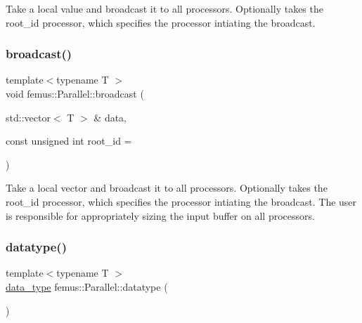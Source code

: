 Take a local value and broadcast it to all processors. Optionally takes the {\ttfamily root\+\_\+id} processor, which specifies the processor intiating the broadcast. \mbox{\label{namespacefemus_1_1_parallel_affafe8ca45b17134d6ee8bbb632aba6b}} 
\subsubsection{\texorpdfstring{broadcast()}{broadcast()}\hspace{0.1cm}{\footnotesize\ttfamily [2/2]}}
{\footnotesize\ttfamily template$<$typename T $>$ \\
void femus\+::\+Parallel\+::broadcast (\begin{DoxyParamCaption}\item[{std\+::vector$<$ T $>$ \&}]{data,  }\item[{const unsigned int}]{root\+\_\+id = {} }\end{DoxyParamCaption})\hspace{0.3cm}{\ttfamily [inline]}}

Take a local vector and broadcast it to all processors. Optionally takes the {\ttfamily root\+\_\+id} processor, which specifies the processor intiating the broadcast. The user is responsible for appropriately sizing the input buffer on all processors. \mbox{\label{namespacefemus_1_1_parallel_a02155e648a68195486e46feabd0f2ec0}} 
\subsubsection{\texorpdfstring{datatype()}{datatype()}}
{\footnotesize\ttfamily template$<$typename T $>$ \\
\mbox{\hyperlink{structfemus_1_1_parallel_1_1data__type}{data\+\_\+type}} femus\+::\+Parallel\+::datatype (\begin{DoxyParamCaption}{ }\end{DoxyParamCaption})\hspace{0.3cm}{\ttfamily [inline]}}

\mbox{\label{namespacefemus_1_1_parallel_a1b8489def6f9d403cde145eab7e56b3b}} 
